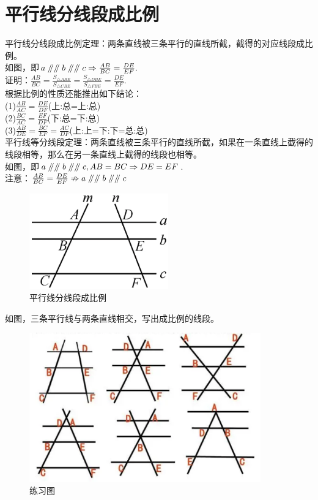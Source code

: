 \documentclass{ecnuthesis}
\newcommand\px{\mathrel{/\mkern-5mu/}}  %
\begin{document}
\section{平行线分线段成比例}
\begin{knowledge}
    平行线分线段成比例定理：两条直线被三条平行的直线所截，截得的对应线段成比例。\\
    如图，即$a\px\px b\px\px c \Rightarrow \frac{AB}{BC}=\frac{DE}{EF}.$ \\
    证明：$\frac{AB}{BC}=\frac{S_{\triangle ABE}}{S_{\triangle CBE}}=\frac{S_{\triangle DBE}}{S_{\triangle FBE}}=\frac{DE}{EF}.$ \\
    根据比例的性质还能推出如下结论：\\
    (1)$\frac{AB}{AC}=\frac{DE}{DF}$(上:总=上:总) \\
    (2)$\frac{BC}{AC}=\frac{EF}{DF}$(下:总=下:总) \\
    (3)$\frac{AB}{DE}=\frac{BC}{EF}=\frac{AC}{DF}$(上:上=下:下=总:总) \\
    平行线等分线段定理：两条直线被三条平行的直线所截，如果在一条直线上截得的线段相等，那么在另一条直线上截得的线段也相等。\\
    如图，即$a\px\px b\px\px c,AB=BC \Rightarrow DE=EF$. \\
    注意：$\frac{AB}{BC}=\frac{DE}{EF} \nRightarrow a \px \px b \px \px c$
\end{knowledge}
\begin{figure}[H]
\centering
\includegraphics[width=6cm]{picture/802.png}
\caption{平行线分线段成比例}
\end{figure}
\begin{problem}
    如图，三条平行线与两条直线相交，写出成比例的线段。
\end{problem}
\begin{figure}[H]
\centering
\includegraphics[width=10cm]{picture/803.png}
\caption{练习图}
\end{figure}
\clearpage
\end{document}
